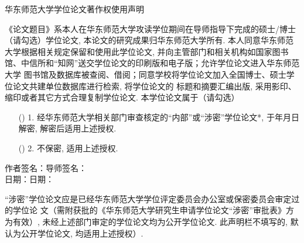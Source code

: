 {\vskip0.7cm
\begin{minipage}[c]{0.95\textwidth}
{\LARGE \bf \centerline{华东师范大学学位论文著作权使用声明} }
\vskip0.3cm
{\normalsize\hspace{2\ccwd}《论文题目》系本人在华东师范大学攻读学位期间在导师指导下完成的硕士/博士
（请勾选）学位论文, 本论文的研究成果归华东师范大学所有. 本人同意华东师范大学根据相关规定保留和使用此学位论文,
并向主管部门和相关机构如国家图书馆、中信所和“知网”送交学位论文的印刷版和电子版；允许学位论文进入华东师范大学
图书馆及数据库被查阅、借阅；同意学校将学位论文加入全国博士、硕士学位论文共建单位数据库进行检索, 将学位论文的
标题和摘要汇编出版, 采用影印、缩印或者其它方式合理复制学位论文. }
\vskip0.3cm
\hspace{2\ccwd}本学位论文属于（请勾选）
\begin{enumerate}
\item[(\qquad)]1. 经华东师范大学相关部门审查核定的“内部”或“涉密”学位论文*,
 于\underline{\qquad}年\underline{\qquad}月\underline{\qquad}日解密, 解密后适用上述授权.
\item[(\qquad)]2. 不保密, 适用上述授权.
\end{enumerate}
\end{minipage}

\parbox[t][2.5cm][c]{0.95\textwidth}{\large \hspace{2cm}
作者签名：\hrulefill \hfill 导师签名：\hrulefill \hspace{1cm}
\\ \hspace*{2cm} 日\hspace{2em}期：\hrulefill \hfill 日\hspace{2em}期：\hrulefill \hspace{1cm} }
\vskip0.3cm\noindent
{\footnotesize * “涉密”学位论文应是已经华东师范大学学位评定委员会办公室或保密委员会审定过的学位论
文（需附获批的《华东师范大学研究生申请学位论文“涉密”审批表》方为有效）,
未经上述部门审定的学位论文均为公开学位论文. 此声明栏不填写的, 默认为公开学位论文, 均适用上述授权）. }


}
